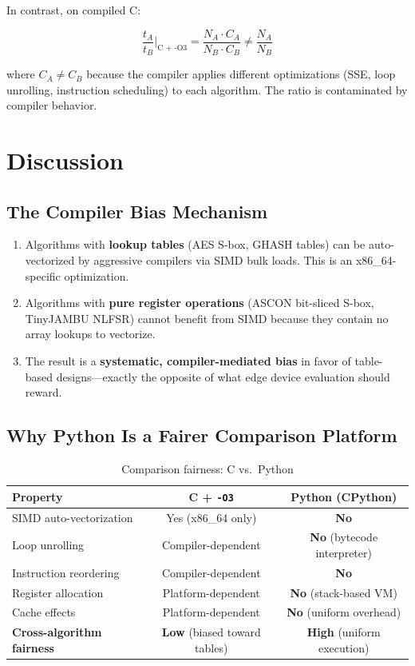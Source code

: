 \documentclass[11pt,a4paper]{article}
\begin{document}
In contrast, on compiled C:

\[
\frac{t_A}{t_B}\Big|_{\text{C + -O3}} = \frac{N_A \cdot C_A}{N_B \cdot C_B} \neq \frac{N_A}{N_B}
\]

where $C_A \neq C_B$ because the compiler applies different optimizations (SSE, loop unrolling, instruction scheduling) to each algorithm. The ratio is contaminated by compiler behavior.

\section{Discussion}

\subsection{The Compiler Bias Mechanism}

\begin{enumerate}[label=(\arabic*)]
    \item Algorithms with \textbf{lookup tables} (AES S-box, GHASH tables) can be auto-vectorized by aggressive compilers via SIMD bulk loads. This is an x86\_64-specific optimization.
    \item Algorithms with \textbf{pure register operations} (ASCON bit-sliced S-box, TinyJAMBU NLFSR) cannot benefit from SIMD because they contain no array lookups to vectorize.
    \item The result is a \textbf{systematic, compiler-mediated bias} in favor of table-based designs---exactly the opposite of what edge device evaluation should reward.
\end{enumerate}

\subsection{Why Python Is a Fairer Comparison Platform}

\begin{table}[H]
\centering
\caption{Comparison fairness: C vs.\ Python}
\label{tab:fairness}
\begin{tabular}{lcc}
\toprule
\textbf{Property} & \textbf{C + {\tt -O3}} & \textbf{Python (CPython)} \\
\midrule
SIMD auto-vectorization & Yes (x86\_64 only) & \textbf{No} \\
Loop unrolling & Compiler-dependent & \textbf{No} (bytecode interpreter) \\
Instruction reordering & Compiler-dependent & \textbf{No} \\
Register allocation & Platform-dependent & \textbf{No} (stack-based VM) \\
Cache effects & Platform-dependent & \textbf{No} (uniform overhead) \\
\midrule
\textbf{Cross-algorithm fairness} & \textbf{Low} (biased toward tables) & \textbf{High} (uniform execution) \\
\bottomrule
\end{tabular}
\end{table}
\end{document}
